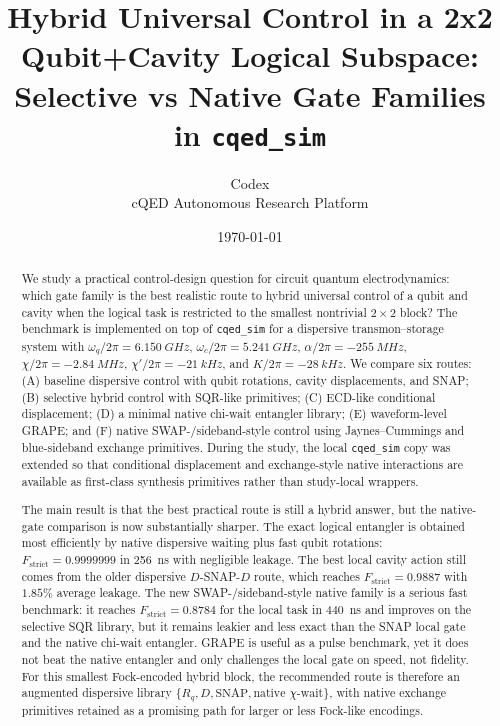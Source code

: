 \documentclass[11pt, a4paper]{article}
\title{\textbf{Hybrid Universal Control in a 2x2 Qubit+Cavity Logical Subspace: Selective vs Native Gate Families in \texttt{cqed\_sim}}}
\author{Codex \\ cQED Autonomous Research Platform}
\date{\today}
\begin{document}
\maketitle

\begin{abstract}
We study a practical control-design question for circuit quantum electrodynamics:
which gate family is the best realistic route to hybrid universal control of a
qubit and cavity when the logical task is restricted to the smallest nontrivial
\(2\times 2\) block? The benchmark is implemented on top of \texttt{cqed\_sim}
for a dispersive transmon--storage system with
\(\omega_q/2\pi=\SI{6.150}{GHz}\), \(\omega_c/2\pi=\SI{5.241}{GHz}\),
\(\alpha/2\pi=\SI{-255}{MHz}\), \(\chi/2\pi=\SI{-2.84}{MHz}\),
\(\chi'/2\pi=\SI{-21}{kHz}\), and \(K/2\pi=\SI{-28}{kHz}\). We compare six
routes: (A) baseline dispersive control with qubit rotations, cavity
displacements, and SNAP; (B) selective hybrid control with SQR-like primitives;
(C) ECD-like conditional displacement; (D) a minimal native chi-wait entangler
library; (E) waveform-level GRAPE; and (F) native SWAP-/sideband-style control
using Jaynes--Cummings and blue-sideband exchange primitives. During the study,
the local \texttt{cqed\_sim} copy was extended so that conditional displacement
and exchange-style native interactions are available as first-class synthesis
primitives rather than study-local wrappers.

The main result is that the best practical route is still a hybrid answer,
but the native-gate comparison is now substantially sharper. The exact logical
entangler is obtained most efficiently by native dispersive waiting plus fast
qubit rotations: \(F_{\mathrm{strict}}=0.9999999\) in \SI{256}{ns} with
negligible leakage. The best local cavity action still comes from the older
dispersive \(D\)-SNAP-\(D\) route, which reaches
\(F_{\mathrm{strict}}=0.9887\) with \(1.85\%\) average leakage. The new
SWAP-/sideband-style native family is a serious fast benchmark: it reaches
\(F_{\mathrm{strict}}=0.8784\) for the local task in \SI{440}{ns} and improves
on the selective SQR library, but it remains leakier and less exact than the
SNAP local gate and the native chi-wait entangler. GRAPE is useful as a pulse
benchmark, yet it does not beat the native entangler and only challenges the
local gate on speed, not fidelity. For this smallest Fock-encoded hybrid block,
the recommended route is therefore an augmented dispersive library
\(\{R_q, D, \mathrm{SNAP}, \text{native }\chi\text{-wait}\}\), with native
exchange primitives retained as a promising path for larger or less Fock-like
encodings.
\end{abstract}
\end{document}
